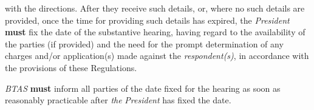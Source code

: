 with the directions. After they receive such details, or, where no such
details are provided, once the time for providing such details has
expired, the \emph{President}  \textcolor{myred}{\textbf{must}} fix the date of the substantive
hearing, having regard to the availability of the parties (if provided)
and the need for the prompt determination of any charges and/or
application(s) made against the \emph{respondent(s)}, in accordance with
the provisions of these Regulations.\\
\par
\emph{BTAS}  \textcolor{myred}{\textbf{must}} inform all parties of the date fixed for the hearing as
soon as reasonably practicable after \emph{the} \emph{President} has
fixed the date.\\
\par
{}

